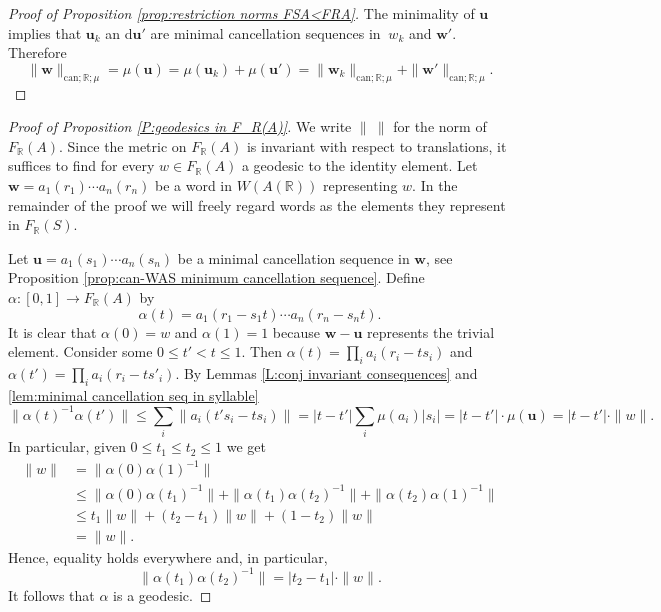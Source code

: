 \documentclass[12pt]{amsart}
\theoremstyle{definition}
\def\RR{\ensuremath{\mathbb{R}}}
\newcommand{\B}[1]{\mathbf{#1}}
\def\can{\text{can}}
\def\Free{F}
\begin{document}
\begin{proof}[Proof of Proposition \ref{prop:restriction norms FSA<FRA}]
The minimality of $\B u$ implies that $\B u_k$ an d$\B u'$ are minimal cancellation sequences in $\ w_k$ and $\B w'$.
Therefore
\[
\| \B w\|_{\can;\RR;\mu} = \mu(\B u) =\mu(\B u_k) + \mu(\B u') = \| \B w_k\|_{\can;\RR;\mu} + \| \B w'\|_{\can;\RR;\mu}.
\]
\fi

\end{proof}




\begin{proof}[Proof of Proposition \ref{P:geodesics in F_R(A)}]
We write $\| \ \|$ for the norm of $\Free_\RR(A)$.
Since the metric on $\Free_\RR(A)$ is invariant with respect to translations, it suffices to find for every $w \in \Free_\RR(A)$ a geodesic to the identity element.
Let $\B w=a_1(r_1) \cdots a_n(r_n)$ be a word in $W(A(\RR))$ representing $w$.
In the remainder of the proof we will freely regard words as the elements they represent in $\Free_\RR(S)$.

Let $\B u=a_1(s_1) \cdots a_n(s_n)$ be a minimal cancellation sequence in $\B w$, see Proposition \ref{prop:can-WAS minimum cancellation sequence}.
Define $\alpha \colon [0,1] \to F_\RR(A)$ by
\[
\alpha(t) = a_1(r_1-s_1t) \cdots a_n(r_n-s_nt).
\]
It is clear that $\alpha(0)=w$ and $\alpha(1)=1$ because $\B w - \B u$ represents the trivial element.
Consider some $0 \leq t' < t \leq 1$.
Then $\alpha(t)=\prod_i a_i(r_i-ts_i)$ and $\alpha(t')=\prod_i a_i(r_i-ts'_i)$.
By Lemmas \ref{L:conj invariant consequences} and \ref{lem:minimal cancellation seq in syllable}
\[
\|\alpha(t)^{-1}\alpha(t')\| \leq \sum_i \|a_i(t's_i-ts_i)\| = |t-t'| \sum_i \mu(a_i)|s_i| = |t-t'| \cdot \mu(\B u) = |t-t'| \cdot \|w\|.
\]
In particular, given $0 \leq t_1 \leq t_2 \leq 1$ we get
\begin{align*}
\|w\| &= \|\alpha(0) \alpha(1)^{-1}\| \\
&\leq \|\alpha(0) \alpha(t_1)^{-1}\| + \|\alpha(t_1)\alpha(t_2)^{-1}\|+\|\alpha(t_2)\alpha(1)^{-1}\| \\
&\leq t_1 \|w\| + (t_2-t_1)\|w\|+(1-t_2)\|w\|\\
& =\|w\|.
\end{align*}
Hence, equality holds everywhere and, in particular, 
\[
\|\alpha(t_1)\alpha(t_2)^{-1}\|=|t_2-t_1| \cdot \|w\|.
\]
It follows that $\alpha$ is a geodesic.
\end{proof}
\end{document}
